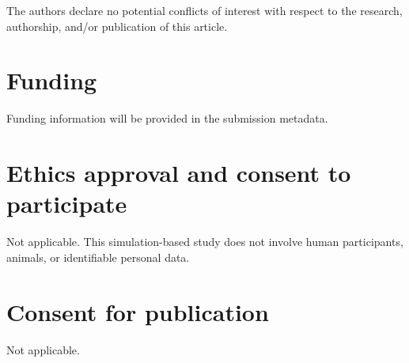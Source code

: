 \documentclass[11pt]{article}
\begin{document}
The authors declare no potential conflicts of interest with respect to the research, authorship, and/or publication of this article.

\section*{Funding}

Funding information will be provided in the submission metadata.

\section*{Ethics approval and consent to participate}

Not applicable. This simulation-based study does not involve human participants, animals, or identifiable personal data.

\section*{Consent for publication}

Not applicable.



\end{document}
